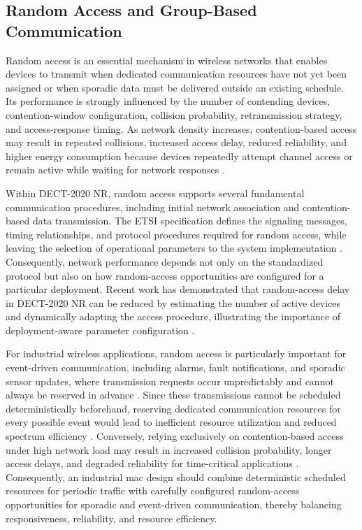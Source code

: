 \documentclass[12pt,a4paper]{article}
\begin{document}
\subsection{Random Access and Group-Based Communication}
\label{subsec:random_access}

Random access is an essential mechanism in wireless networks that enables devices to transmit when dedicated communication resources have not yet been assigned or when sporadic data must be delivered outside an existing schedule. Its performance is strongly influenced by the number of contending devices, contention-window configuration, collision probability, retransmission strategy, and access-response timing. As network density increases, contention-based access may result in repeated collisions, increased access delay, reduced reliability, and higher energy consumption because devices repeatedly attempt channel access or remain active while waiting for network responses \cite{andrewsProvidingQualityService2001,fattahOverviewSchedulingAlgorithms2002a}.

Within DECT-2020 NR, random access supports several fundamental communication procedures, including initial network association and contention-based data transmission. The ETSI specification defines the signaling messages, timing relationships, and protocol procedures required for random access, while leaving the selection of operational parameters to the system implementation \cite{etsi_ts103636_4}. Consequently, network performance depends not only on the standardized protocol but also on how random-access opportunities are configured for a particular deployment. Recent work has demonstrated that random-access delay in DECT-2020 NR can be reduced by estimating the number of active devices and dynamically adapting the access procedure, illustrating the importance of deployment-aware parameter configuration \cite{gaidamakaOptimizingDelaysRandom2025}.

For industrial wireless applications, random access is particularly important for event-driven communication, including alarms, fault notifications, and sporadic sensor updates, where transmission requests occur unpredictably and cannot always be reserved in advance \cite{willigWirelessTechnologyIndustrial2005,vitturiIndustrialWirelessNetworks2013,wollschlaegerFutureIndustrialCommunication2017a}. Since these transmissions cannot be scheduled deterministically beforehand, reserving dedicated communication resources for every possible event would lead to inefficient resource utilization and reduced spectrum efficiency \cite{andrewsProvidingQualityService2001}. Conversely, relying exclusively on contention-based access under high network load may result in increased collision probability, longer access delays, and degraded reliability for time-critical applications \cite{fattahOverviewSchedulingAlgorithms2002a,gaidamakaOptimizingDelaysRandom2025}. Consequently, an industrial \gls{mac} design should combine deterministic scheduled resources for periodic traffic with carefully configured random-access opportunities for sporadic and event-driven communication, thereby balancing responsiveness, reliability, and resource efficiency.
\end{document}
